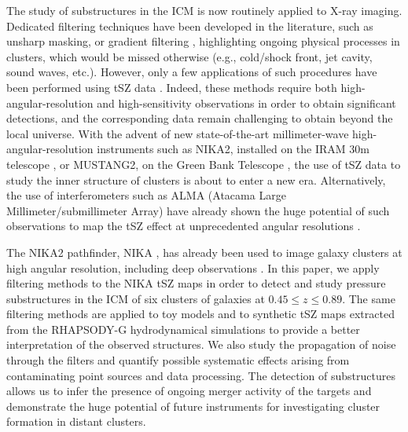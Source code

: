 \documentclass[traditabstract]{aa}
\begin{document}
The study of substructures in the ICM is now routinely applied to X-ray imaging. Dedicated filtering techniques have been developed in the literature, such as unsharp masking, or gradient filtering \citep[see, e.g., recent results by][]{Sanders2016a}, highlighting ongoing physical processes in clusters, which would be missed otherwise (e.g., cold/shock front, jet cavity, sound waves, etc.). However, only a few applications of such procedures have been performed using tSZ data \citep[see e.g.,][using simulated nearby Planck clusters]{Bourdin2015}. Indeed, these methods require both high-angular-resolution and high-sensitivity observations in order to obtain significant detections, and the corresponding data remain challenging to obtain beyond the local universe. With the advent of new state-of-the-art millimeter-wave high-angular-resolution instruments such as NIKA2, installed on the IRAM 30m telescope \citep[The New IRAM KIDs Array 2, $< 20$ arcsec resolution at 150 and 260 GHz,][]{Calvo2016,Catalano2016,NIKA2017}, or MUSTANG2, on the Green Bank Telescope \citep[The MUltiplexed Squid Tes Array at Ninety Gigahertzh 2, $\sim 8$ arcsec at 90 GHz,][]{Dicker2014}, the use of tSZ data to study the inner structure of clusters is about to enter a new era. Alternatively, the use of interferometers such as ALMA (Atacama Large Millimeter/submillimeter Array) have already shown the huge potential of such observations to map the tSZ effect at unprecedented angular resolutions \citep{Kitayama2016,Basu2016}.

The NIKA2 pathfinder, NIKA \citep{Monfardini2011,Catalano2014}, has already been used to image galaxy clusters at high angular resolution, including deep observations \citep{Adam2014,Adam2015,Adam2016a,Adam2016b,Ruppin2016}. In this paper, we apply filtering methods to the NIKA tSZ maps in order to detect and study pressure substructures in the ICM of six clusters of galaxies at $0.45 \leq z \leq 0.89$. The same filtering methods are applied to toy models and to synthetic tSZ maps extracted from the RHAPSODY-G hydrodynamical simulations \citep{Wu2013,Hahn2017} to provide a better interpretation of the observed structures. We also study the propagation of noise through the filters and quantify possible systematic effects arising from contaminating point sources and data processing. The detection of substructures allows us to infer the presence of ongoing merger activity of the targets and demonstrate the huge potential of future instruments for investigating cluster formation in distant clusters.
\end{document}

